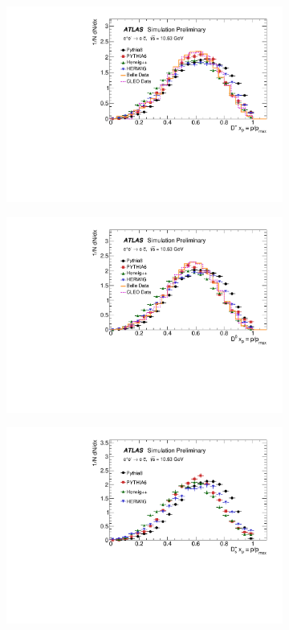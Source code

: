 \begin{figure}
\centering
 \begin{subfigure}[]{0.45\textwidth}
\includegraphics[width=\textwidth]{evtgen/figures/Frag/DPlusFrag.pdf}
\end{subfigure}
 \begin{subfigure}[]{0.45\textwidth}
\includegraphics[width=\textwidth]{evtgen/figures/Frag/D0Frag.pdf}
\end{subfigure}
\begin{subfigure}[]{0.45\textwidth}
\includegraphics[width=\textwidth]{evtgen/figures/Frag/DSplusFrag.pdf}

\end{subfigure}
\end{figure}
